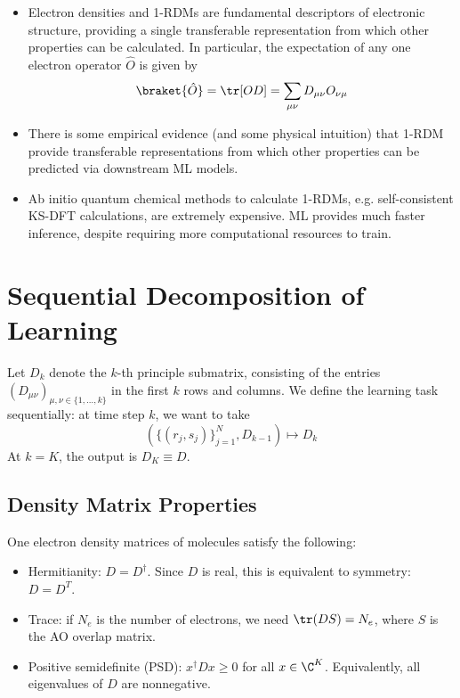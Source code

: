 \documentclass[12pt]{article}
\begin{document}
    \begin{itemize}
        \item Electron densities and 1-RDMs are fundamental descriptors of electronic structure, providing a single transferable representation from which other properties can be calculated. In particular, the expectation of any one electron operator $\hat O$ is given by
        \[ \braket{\hat O} = \tr[OD] = \sum_{\mu \nu} D_{\mu \nu} O_{\nu \mu}\]
        \item There is some empirical evidence (and some physical intuition) that 1-RDM provide transferable representations from which other properties can be predicted via downstream ML models.
        \item Ab initio quantum chemical methods to calculate 1-RDMs, e.g. self-consistent KS-DFT calculations, are extremely expensive. ML provides much faster inference, despite requiring more computational resources to train.

    \end{itemize}
    

    \section{Sequential Decomposition of Learning}
    Let $D_k$ denote the $k$-th principle submatrix, consisting of the entries $(D_{\mu \nu})_{\mu, \nu \in \{1, \ldots, k\}}$ in the first $k$ rows and columns.  We define the learning task sequentially: at time step $k$, we want to take
    \[ (\{(r_j, s_j)\}_{j=1}^N, D_{k-1} ) \mapsto D_k\]
    At $k = K$, the output is $D_K \equiv D$. 

    \subsection{Density Matrix Properties}
    One electron density matrices of molecules satisfy the following:
    \begin{itemize}
        \item[(1)] Hermitianity: $D = D^\dagger$. Since $D$ is real, this is equivalent to symmetry: $D = D^T$.
        \item[(2)] Trace: if $N_e$ is the number of electrons, we need $\tr(DS) = N_e$, where $S$ is the AO overlap matrix.
        \item[(3)] Positive semidefinite (PSD): $x^\dagger D x \geq 0$ for all $x \in \C^K$. Equivalently, all eigenvalues of $D$ are nonnegative. 
    \end{itemize}
\end{document}
